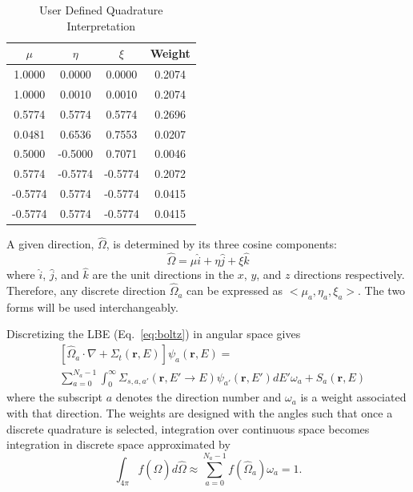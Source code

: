 \begin{table}[ht]
\caption{User Defined Quadrature Interpretation}
\centering 
\begin{tabular}{c c c c}
\hline \hline   
$\mu$    & $\eta$ & $\xi$ & Weight\\ [0.5ex] 
\hline
 1.0000  &  0.0000  &  0.0000  & 0.2074 \\
 1.0000  &  0.0010  &  0.0010  & 0.2074 \\
 0.5774  &  0.5774  &  0.5774  & 0.2696 \\
 0.0481  &  0.6536  &  0.7553  & 0.0207 \\
 0.5000  & -0.5000  &  0.7071  & 0.0046 \\
 0.5774  & -0.5774  & -0.5774  & 0.2072 \\
-0.5774  &  0.5774  & -0.5774  & 0.0415 \\
-0.5774  &  0.5774  & -0.5774  & 0.0415 \\ [1ex]
\hline
\end{tabular}
\label{tab:quad_interp}
\end{table}

A given direction, $\hat{\Omega}$, is determined by its three cosine components: 
\begin{equation} \label{eq:omega_cos}
\hat{\Omega} = \mu \hat{i} + \eta \hat{j} + \xi \hat{k}
\end{equation}
where $\hat{i}$, $\hat{j}$, and $\hat{k}$ are the unit directions in the $x$, $y$, and $z$ directions respectively. Therefore, any discrete direction $\hat{\Omega}_a$ can be expressed as $<\mu_a, \eta_a, \xi_a>$. The two forms will be used interchangeably.

Discretizing the LBE (Eq.~\ref{eq:boltz}) in angular space gives
\begin{equation} \label{eq:boltz_a}
\begin{split}
&\left[ \hat{\Omega}_a \cdot \nabla + \Sigma_t(\boldsymbol{r}, E) \right]
\psi_{a}(\boldsymbol{r}, E) = \\
&\sum_{a=0}^{N_a-1} \int_0^\infty \Sigma_{s, a, a'}(\boldsymbol{r}, E' \rightarrow E) \psi_{a'}(\boldsymbol{r}, E') dE' \omega_a + S_a(\boldsymbol{r}, E)
\end{split}
\end{equation}
where the subscript $a$ denotes the direction number and $\omega_a$ is a weight associated with that direction. The weights are designed with the angles such that once a discrete quadrature is selected, integration over continuous space becomes integration in discrete space approximated by
\begin{equation} \label{eq:disc_int}
\int_{4 \pi} f(\hat{\Omega}) d\hat{\Omega} \approx \sum_{a=0}^{N_a-1} f(\hat{\Omega}_a) \omega_a = 1.
\end{equation}

